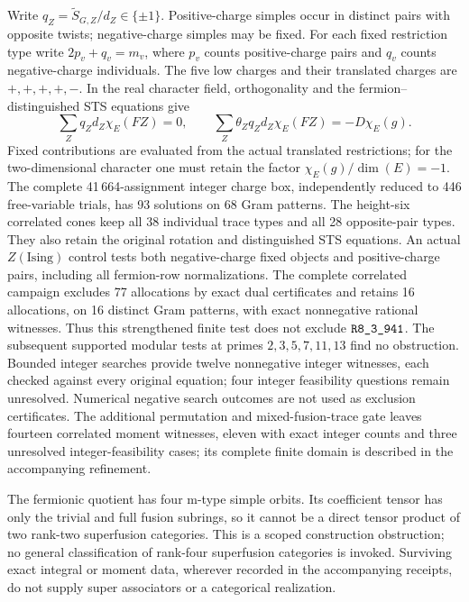 Write $q_Z=\widetilde S_{G,Z}/d_Z\in\{\pm1\}$.
Positive-charge simples occur in distinct pairs with opposite twists;
negative-charge simples may be fixed.  For each fixed restriction type
write $2p_v+q_v=m_v$, where $p_v$ counts positive-charge pairs and $q_v$
counts negative-charge individuals.  The five low charges and their
translated charges are $+,+,+,+,-$.  In the real character field,
orthogonality and the fermion--distinguished STS equations give
\[
 \sum_Z q_Zd_Z\chi_E(FZ)=0,
 \qquad
 \sum_Z\theta_Zq_Zd_Z\chi_E(FZ)=-D\chi_E(g).
\]
Fixed contributions are evaluated from the actual translated restrictions;
for the two-dimensional character one must retain the factor
$\chi_E(g)/\dim(E)=-1$.
The complete 41\,664-assignment integer charge box, independently reduced
to 446 free-variable trials, has 93 solutions on 68 Gram patterns.
The height-six correlated cones keep all 38 individual trace types and
all 28 opposite-pair types.  They also retain the original rotation and
distinguished STS equations.  An actual $Z(\mathrm{Ising})$ control tests
both negative-charge fixed objects and positive-charge pairs, including
all fermion-row normalizations.
The complete correlated campaign excludes 77 allocations by exact dual
certificates and retains 16 allocations, on 16 distinct Gram patterns,
with exact nonnegative rational witnesses.  Thus this strengthened finite
test does not exclude $\sha{R8_3_941}$.
The subsequent supported modular tests at primes $2,3,5,7,11,13$ find no
obstruction.  Bounded integer searches provide twelve nonnegative integer
witnesses, each checked against every original equation; four integer
feasibility questions remain unresolved.  Numerical negative search
outcomes are not used as exclusion certificates.
The additional permutation and mixed-fusion-trace gate leaves fourteen
correlated moment witnesses, eleven with exact integer counts and three
unresolved integer-feasibility cases; its complete finite domain is
described in the accompanying refinement.

The fermionic quotient has four m-type simple orbits.  Its coefficient
tensor has only the trivial and full fusion subrings, so it cannot be a
direct tensor product of two rank-two superfusion categories.  This is a
scoped construction obstruction; no general classification of rank-four
superfusion categories is invoked.  Surviving exact integral or moment
data, wherever recorded in the accompanying receipts, do not supply
super associators or a categorical realization.

